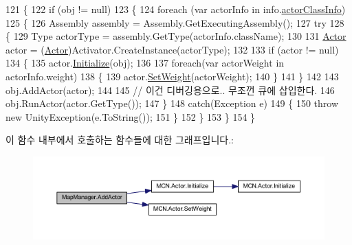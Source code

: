 \begin{DoxyCode}
121     \{
122         \textcolor{keywordflow}{if} (obj != null)
123         \{
124             \textcolor{keywordflow}{foreach} (var actorInfo \textcolor{keywordflow}{in} info.\hyperlink{class_m_c_n_1_1_place_info_a53e63fce0254eb635a1c6a302bce97d1}{actorClassInfo})
125             \{
126                 Assembly assembly = Assembly.GetExecutingAssembly();
127                 \textcolor{keywordflow}{try}
128                 \{
129                     Type actorType = assembly.GetType(actorInfo.className);
130 
131                     \hyperlink{class_m_c_n_1_1_actor}{Actor} actor = (\hyperlink{class_m_c_n_1_1_actor}{Actor})Activator.CreateInstance(actorType);
132 
133                     \textcolor{keywordflow}{if} (actor != null)
134                     \{
135                         actor.\hyperlink{class_m_c_n_1_1_actor_aadb5d1045def818bbcba4cd2248f2f1c}{Initialize}(obj);
136 
137                         \textcolor{keywordflow}{foreach}(var actorWeight \textcolor{keywordflow}{in} actorInfo.weight)
138                         \{
139                             actor.\hyperlink{class_m_c_n_1_1_actor_a8d8020782aefa7fff625f5f8e09f7539}{SetWeight}(actorWeight);
140                         \}
141                     \}
142 
143                     obj.AddActor(actor);
144 
145                     \textcolor{comment}{// 이건 디버깅용으로.. 무조껀 큐에 삽입한다.}
146                     obj.RunActor(actor.GetType());
147                 \}
148                 \textcolor{keywordflow}{catch}(Exception e)
149                 \{
150                     \textcolor{keywordflow}{throw} \textcolor{keyword}{new} UnityException(e.ToString());
151                 \}
152             \}
153         \}
154     \}
\end{DoxyCode}


이 함수 내부에서 호출하는 함수들에 대한 그래프입니다.\+:\nopagebreak
\begin{figure}[H]
\begin{center}
\leavevmode
\includegraphics[width=350pt]{class_map_manager_a3fd471f20bdfc00d53997d782bc3339a_cgraph}
\end{center}
\end{figure}




